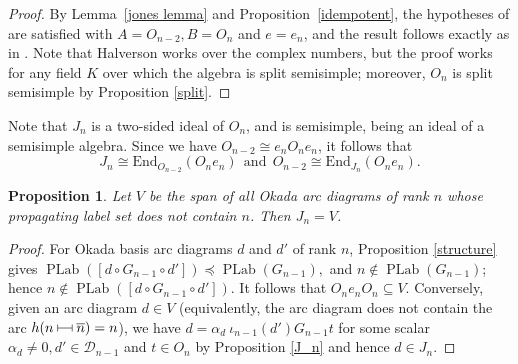 \documentclass[12pt,reqno]{amsart}
\numberwithin{equation}{section}
\newtheorem{proposition}[theorem]{Proposition}
\theoremstyle{definition}
\theoremstyle{definition}
\newcommand{\PLab}{\operatorname{PLab}}
\newcommand{\arcjoin}{\mathrel{%
  \rule[0.1ex]{0.4pt}{1.1ex}%
  \rule[0.6ex]{1em}{0.4pt}%
  \rule[0.1ex]{0.4pt}{1.1ex}%
}}
\begin{document}
\begin{proof}
By Lemma~\ref{jones lemma} and Proposition~\ref{idempotent}, the hypotheses of \cite[(5.1.1)]{HalversonPartition} are satisfied with $A=O_{n-2}, B=O_n$ and $e=e_n$, and the result follows exactly as in \cite[Proposition 5.1.3]{HalversonPartition}. Note that Halverson works over the complex numbers, but the proof works for any field $K$ over which the algebra is split semisimple; moreover,  $O_n$ is split semisimple by Proposition \ref{split}.
\end{proof}
Note that $J_n$ is a two-sided ideal of $O_n$, and is semisimple, being an ideal of a semisimple algebra. 
Since we have $O_{n-2} \cong e_n O_n e_n$, it follows that 
\begin{equation}\label{double}
    J_n \cong \mathrm{End}_{O_{n-2}} (O_ne_n) ~~\text{and}~~ O_{n-2}  \cong \mathrm{End}_{J_n}(O_ne_n). 
\end{equation}
\begin{proposition} Let $V$ be the span of all Okada arc diagrams of rank $n$ whose propagating label set does not contain $n$. Then $J_n=V$.
\end{proposition}
\begin{proof}
For Okada basis arc diagrams $d$ and $d'$ of rank $n$, Proposition \ref{structure} gives $\PLab([d\circ G_{n-1}\circ d']) \preccurlyeq \PLab(G_{n-1}),$ and $n \notin \PLab(G_{n-1})$; hence $ n \notin \PLab([d\circ G_{n-1}\circ d']).$ It follows that $O_ne_nO_n \subseteq V$. Conversely, given an arc diagram $d \in V$ (equivalently, the arc diagram does not contain the arc $h(n \arcjoin \overline{n})=n$), we have $d= \alpha_d ~\iota_{n-1}(d') G_{n-1}t $ for some scalar $\alpha_d \neq 0, d' \in \mathcal{D}_{n-1}$ and $t \in O_n$ by Proposition \ref{J_n} and hence $d \in J_n$. 
\end{proof}
\end{document}
